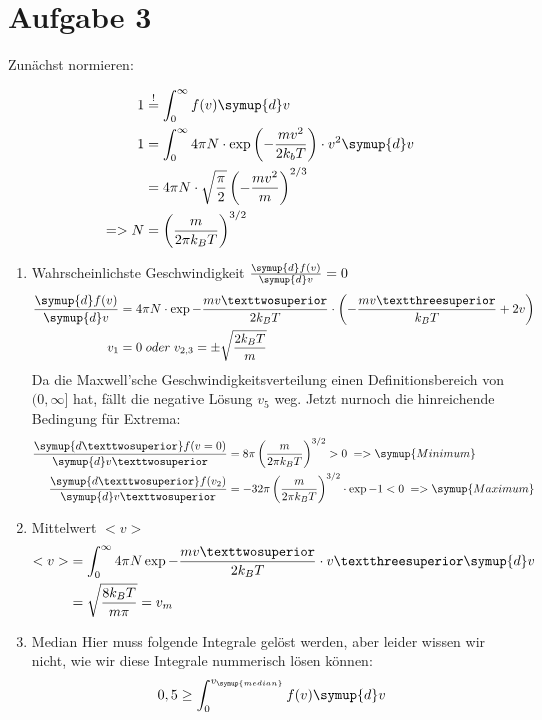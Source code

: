 \section{Aufgabe 3}

Zunächst normieren:

\begin{align*}
  1 &\stackrel{!}{=}\int_0^{\infty} f(v)\symup{d}v \\
  1 &= \int_0^{\infty} 4 \pi N \cdot \exp{\left(- \frac{mv^2}{2k_bT}\right)}\cdot v^2 \symup{d}v \\
  &= 4 \pi N \cdot \sqrt{\frac{\pi}{2}} \left(- \frac{mv^2}{m} \right)^{2/3} \\
  => N &= \left( \frac{m}{2 \pi k_B T} \right)^{3/2}
\end{align*}

\begin{enumerate}
  \item Wahrscheinlichste Geschwindigkeit $\frac{\symup{d}f(v)}{\symup{d}v} = 0$
  \begin{align*}
    \frac{\symup{d}f(v)}{\symup{d}v} &= 4 \pi N \cdot \exp{-\frac{mv²}{2k_BT}} \cdot \left( - \frac{mv³}{k_BT}  + 2v\right)\\
    v_1 &= 0 \; oder \; v_{2,3} =  \pm \sqrt{\frac{2k_BT}{m}}
  \end{align*}
  Da die Maxwell'sche Geschwindigkeitsverteilung einen Definitionsbereich von $(0, \infty]$ hat, fällt die negative Lösung $v_5$ weg.
  Jetzt nurnoch die hinreichende Bedingung für Extrema:
  \begin{align*}
    \frac{\symup{d²}f(v=0)}{\symup{d}v²} &=  8 \pi \left( \frac{m}{2 \pi k_BT} \right)^{3/2} > 0 \; => \symup{Minimum}\\
    \frac{\symup{d²}f(v_2)}{\symup{d}v²} &= -32 \pi \left( \frac{m}{2 \pi k_BT} \right)^{3/2} \cdot \exp{-1} < 0 \; => \symup{Maximum}
  \end{align*}
  \item Mittelwert $<v>$
    \begin{align*}
      <v> &= \int_0^{\infty} 4 \pi N \exp{-\frac{mv²}{2k_BT}} \cdot v³ \symup{d}v \\
      &= \sqrt{\frac{8k_BT}{m \pi}} =v_m
    \end{align*}
  \item Median
    Hier muss folgende Integrale gelöst werden, aber leider wissen wir nicht, wie wir diese Integrale nummerisch lösen können:
    \begin{align*}
      0,5 &\geq \int_{0}^{v_{\symup{median}}} f(v) \symup{d}v \\

\end{align*}
\end{enumerate}
